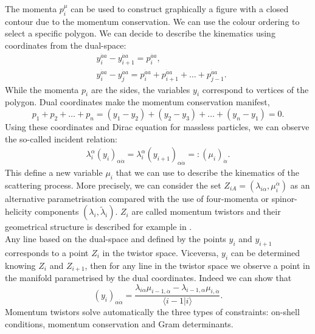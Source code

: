 The momenta $p_i^\mu$ can be used to construct graphically a figure with a closed contour due to the momentum conservation. We can use the colour ordering to select a specific polygon. We can decide to describe the kinematics using coordinates from the dual-space:
\begin{align*}
	&y_i^{\dot aa}-y_{i+1}^{\dot a a}=p_i^{\dot a a},\\
	&y_i^{\dot aa}-y_j^{\dot aa}=p_i^{\dot aa}+p_{i+1}^{\dot aa}+\dots + p_{j-1}^{\dot aa}.
\end{align*}
While the momenta $p_i$ are the sides, the variables $y_i$ correspond to vertices of the polygon. Dual coordinates make the momentum conservation manifest,
$$
	p_1+p_2+\dots+p_n=(y_1-y_2)+(y_2-y_3)+\dots+(y_n-y_1)=0.
$$
Using these coordinates and Dirac equation for massless particles, we can observe the so-called incident relation:
\begin{align}
	\lambda_i^{\alpha}(y_i)_{\alpha\dot\alpha}=\lambda_i^{\alpha}(y_{i+1})_{\alpha\dot\alpha}=:(\mu_i)_{\dot\alpha}.
	\label{incidentrel}
\end{align}
This define a new variable $\mu_i$ that we can use to describe the kinematics of the scattering process. More precisely, we can consider the set $Z_{iA}=(\lambda_{i\alpha},\mu_i^{\dot\alpha})$ as an alternative parametrisation compared with the use of four-momenta or spinor-helicity components $(\lambda_i,\tilde\lambda_i)$. $Z_i$ are called momentum twistors and their geometrical structure is described for example in \cite{2014}.\\
Any line based on the dual-space and defined by the points $y_i$ and $y_{i+1}$ corresponds to a point $Z_i$ in the twistor space. Viceversa, $y_i$ can be determined knowing $Z_i$ and $Z_{i+1}$, then for any line in the twistor space we observe a point in the manifold parametrised by the dual coordinates. Indeed we can show that
$$
	(y_{i})_{\alpha\dot\alpha}=\frac{\lambda_{i\alpha}\mu_{i-1,\dot\alpha}-\lambda_{i-1,\alpha}\mu_{i,\dot\alpha}}{\langle i-1|i \rangle}.
$$
Momentum twistors solve automatically the three types of constraints: on-shell conditions, momentum conservation and Gram determinants.\\
